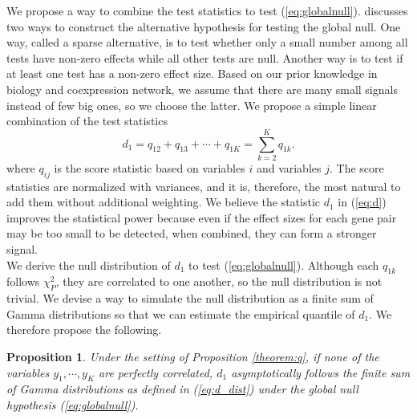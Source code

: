 \documentclass[aoas,authoryear, preprint]{imsart}
\numberwithin{equation}{section}
\theoremstyle{plain}
\newtheorem{prop}{Proposition}
\begin{document}
We propose a way to combine the test statistics to test (\ref{eq:globalnull}). \cite{chen2012exponential} discusses two ways to construct the alternative hypothesis for testing the global null. One way, called a sparse alternative, is to test whether only a small number among all tests have non-zero effects while all other tests are null. Another way is to test if at least one test has a non-zero effect size. Based on our prior knowledge in biology and coexpression network, we assume that there are many small signals instead of few big ones, so we choose the latter. We propose a simple linear combination of the test statistics
\begin{equation}
d_1 = {q}_{12} + {q}_{13} + \cdots + {q}_{1K} = \sum_{k=2}^{K} {q}_{1k}.
\label{eq:d}
\end{equation}
where $q_{ij}$ is the score statistic based on variables $i$ and variables $j$. The score statistics are normalized with variances, and it is, therefore, the most natural to add them without additional weighting. We believe the statistic $d_1$ in  (\ref{eq:d}) improves the statistical power because even if the effect sizes for each gene pair may be too small to be detected, when combined, they can form a stronger signal. \\

We derive the null distribution of $d_1$ to test (\ref{eq:globalnull}). Although each ${q}_{1k}$ follows $\chi_{P}^2$, they are correlated to one another, so the null distribution is not trivial. We devise a way to simulate the null distribution as a finite sum of Gamma distributions so that we can estimate the empirical quantile of $d_1$. We therefore propose the following.

\begin{prop}
Under the setting of Proposition \ref{theorem:q}, if none of the variables $y_1, \cdots, y_K$ are perfectly correlated, $d_1$ asymptotically follows the finite sum of Gamma distributions as defined in (\ref{eq:d_dist}) under the global null hypothesis (\ref{eq:globalnull}). 
\end{prop}
\end{document}
